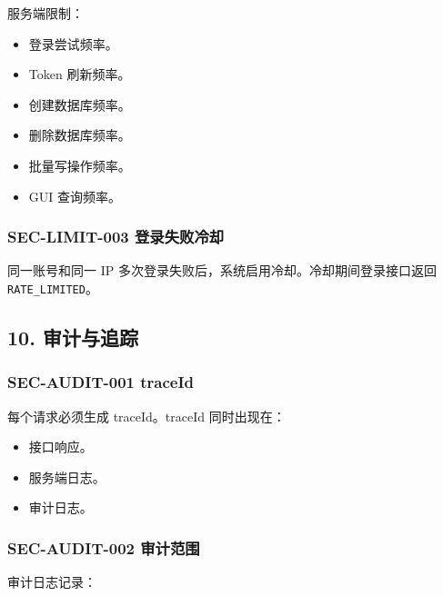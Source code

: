 \documentclass[
  a4paper,
  UTF8]{ctexart}
\providecommand{\tightlist}{%
  \setlength{\itemsep}{0pt}\setlength{\parskip}{0pt}}
\begin{document}
服务端限制：

\begin{itemize}
\tightlist
\item
  登录尝试频率。
\item
  Token 刷新频率。
\item
  创建数据库频率。
\item
  删除数据库频率。
\item
  批量写操作频率。
\item
  GUI 查询频率。
\end{itemize}

\hypertarget{sec-limit-003-ux767bux5f55ux5931ux8d25ux51b7ux5374}{%
\subsubsection{SEC-LIMIT-003
登录失败冷却}\label{sec-limit-003-ux767bux5f55ux5931ux8d25ux51b7ux5374}}

同一账号和同一 IP 多次登录失败后，系统启用冷却。冷却期间登录接口返回
\texttt{RATE\_LIMITED}。

\hypertarget{ux5ba1ux8ba1ux4e0eux8ffdux8e2a}{%
\subsection{10. 审计与追踪}\label{ux5ba1ux8ba1ux4e0eux8ffdux8e2a}}

\hypertarget{sec-audit-001-traceid}{%
\subsubsection{SEC-AUDIT-001 traceId}\label{sec-audit-001-traceid}}

每个请求必须生成 traceId。traceId 同时出现在：

\begin{itemize}
\tightlist
\item
  接口响应。
\item
  服务端日志。
\item
  审计日志。
\end{itemize}

\hypertarget{sec-audit-002-ux5ba1ux8ba1ux8303ux56f4}{%
\subsubsection{SEC-AUDIT-002
审计范围}\label{sec-audit-002-ux5ba1ux8ba1ux8303ux56f4}}

审计日志记录：
\end{document}
